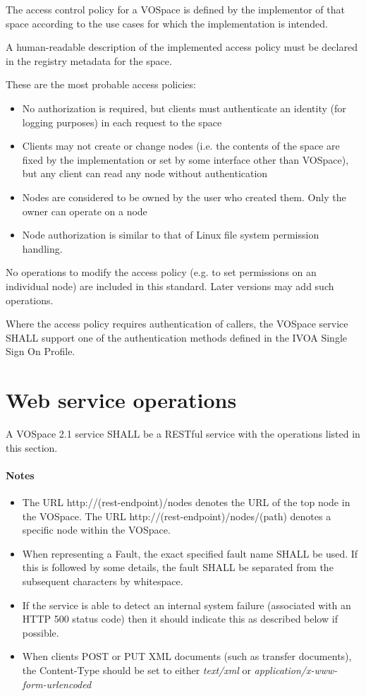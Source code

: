 \documentclass[11pt,a4paper]{ivoa}
\begin{document}
The access control policy for a VOSpace is defined by the implementor of that space according to the use cases for which the implementation is intended.

A human-readable description of the implemented access policy must be declared in the registry metadata for the space.

These are the most probable access policies:

\begin{itemize}
    \item No authorization is required, but clients must authenticate an identity (for logging purposes) in each request to the space
    \item Clients may not create or change nodes (i.e. the contents of the space are fixed by the implementation or set by some interface other than VOSpace), but any client can read any node without authentication
    \item Nodes are considered to be owned by the user who created them. Only the owner can operate on a node
    \item Node authorization is similar to that of Linux file system permission handling.
\end{itemize}

No operations to modify the access policy (e.g. to set permissions on an individual node) are included in this standard. Later versions may add such operations.

Where the access policy requires authentication of callers, the VOSpace service SHALL support one of the authentication methods defined in the IVOA Single Sign On Profile.

\section{Web service operations}
\label{sec:web service operations}

A VOSpace 2.1 service SHALL be a RESTful service with the operations listed in this section.

\paragraph{Notes}
\begin{itemize}
    \item The URL http://(rest-endpoint)/nodes denotes the URL of the top node in the VOSpace. The URL http://(rest-endpoint)/nodes/(path) denotes a specific node within the VOSpace.
    \item When representing a Fault, the exact specified fault name SHALL be used. If this is followed by some details, the fault SHALL be separated from the subsequent characters by whitespace.
    \item If the service is able to detect an internal system failure (associated with an HTTP 500 status code) then it should indicate this as described below if possible.
    \item When clients POST or PUT XML documents (such as transfer documents), the Content-Type should be set to either \emph{text/xml} or \emph{application/x-www-form-urlencoded}
\end{itemize}
\end{document}
